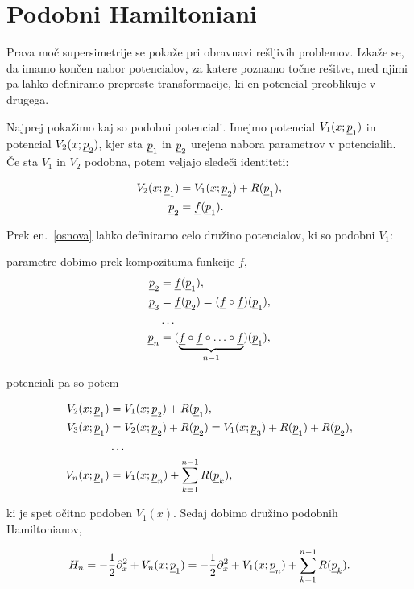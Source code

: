 \section{Podobni Hamiltoniani}

Prava mo\v c supersimetrije se poka\v ze pri obravnavi re\v sljivih problemov. Izka\v ze se, da
imamo kon\v cen nabor potencialov, za katere poznamo to\v cne re\v sitve, med njimi pa lahko definiramo
preproste transformacije, ki en potencial preoblikuje v drugega.

Najprej poka\v zimo kaj so podobni potenciali. Imejmo potencial $V_1 (x; \underline{p}_1)$ in potencial
$V_2 (x; \underline{p}_2)$, kjer sta $\underline{p}_1$ in $\underline{p}_2$ urejena nabora parametrov v potencialih. \v Ce sta
$V_1$ in $V_2$ podobna, potem veljajo slede\v ci identiteti:

\begin{align}
	V_2 (x; \underline{p}_1) &= V_1 (x; \underline{p}_2) + R (\underline{p}_1), \\
	\underline{p}_2 &= \underline{f} (\underline{p}_1). \label{osnova}
\end{align}

Prek en.~\eqref{osnova} lahko definiramo celo dru\v zino potencialov, ki so podobni $V_1$:

parametre dobimo prek kompozituma funkcije $f$,
\begin{align}
	\underline{p}_2 &= \underline{f} (\underline{p}_1), \notag \\
	\underline{p}_3 &= \underline{f} (\underline{p}_2) = (\underline{f} \circ \underline{f}) (\underline{p}_1), \notag \\
	&\ldots \notag \\
	\underline{p}_n &= (\underbrace{\underline{f} \circ \underline{f} \circ \ldots \circ \underline{f}}_{n-1}) (\underline{p}_1),
\end{align}

potenciali pa so potem

\begin{align}
	V_2 (x; \underline{p}_1) &= V_1 (x; \underline{p}_2) + R (\underline{p}_1), \notag \\
	V_3 (x; \underline{p}_1) &= V_2 (x; \underline{p}_2) + R (\underline{p}_2) = V_1 (x; \underline{p}_3) + R (\underline{p}_1) + R (\underline{p}_2), \notag \\
	&\ldots \notag \\
	V_n (x; \underline{p}_1) &= V_1 (x; \underline{p}_n) + \sum_{k = 1}^{n-1} R (\underline{p}_k),
\end{align}

ki je spet o\v citno podoben $V_1 (x)$. Sedaj dobimo dru\v zino podobnih Hamiltonianov,

\begin{equation}
	H_n = - \frac{1}{2}\partial_x^2 + V_n (x;\underline{p}_1) = - \frac{1}{2}\partial_x^2+V_1(x;\underline{p}_n)+\sum_{k = 1}^{n-1}R(\underline{p}_k).
\end{equation}

